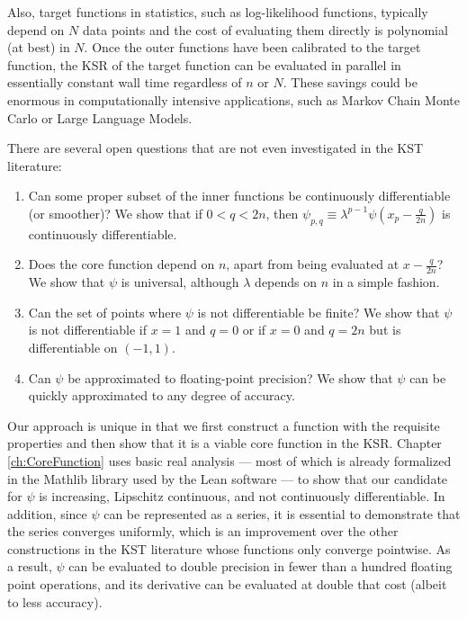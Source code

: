 Also, target functions in statistics, such as log-likelihood functions, typically depend on $N$ data points and the cost of evaluating them directly is polynomial (at best) in $N$. Once the outer functions have been calibrated to the target function, the KSR of the target function can be evaluated in parallel in essentially constant wall time regardless of $n$ or $N$. These savings could be enormous in computationally intensive applications, such as Markov Chain Monte Carlo or Large Language Models.

There are several open questions that are not even investigated in the KST literature:
\begin{enumerate}
    \item Can some proper subset of the inner functions be continuously differentiable (or smoother)? We show that if $0 < q < 2n$, then $\psi_{p,q} \equiv \lambda^{p - 1} \psi\left(x_p - \frac{q}{2n}\right)$ is continuously differentiable.
    \item Does the core function depend on $n$, apart from being evaluated at $x - \frac{q}{2n}$? We show that $\psi$ is universal, although $\lambda$ depends on $n$ in a simple fashion.    
    \item Can the set of points where $\psi$ is not differentiable be finite? We show that $\psi$ is not differentiable if $x = 1$ and $q = 0$ or if $x = 0$ and $q = 2n$ but is differentiable on $\left(-1,1\right)$.
    \item Can $\psi$ be approximated to floating-point precision? We show that $\psi$ can be quickly approximated to any degree of accuracy. 
\end{enumerate}

Our approach is unique in that we first construct a function with the requisite properties and then show that it is a viable core function in the KSR. Chapter \ref{ch:CoreFunction} uses basic real analysis --- most of which is already formalized in the Mathlib library used by the Lean software --- to show that our candidate for $\psi$ is increasing, Lipschitz continuous, and not continuously differentiable. In addition, since $\psi$ can be represented as a series, it is essential to demonstrate that the series converges uniformly, which is an improvement over the other constructions in the KST literature whose functions only converge pointwise. As a result, $\psi$ can be evaluated to double precision in fewer than a hundred floating point operations, and its derivative can be evaluated at double that cost (albeit to less accuracy).

